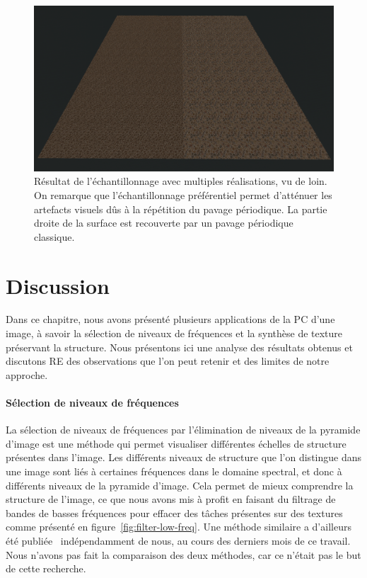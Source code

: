 \begin{figure}[t]
    \centering
    \includegraphics[width=\textwidth]{contenu/resources/images/partitioned_sampling_pc_preserving_shuffle_uv_far}
    \caption[Résultat de l'échantillonnage avec multiples réalisations, vu de loin.]{Résultat de l'échantillonnage avec multiples réalisations, vu de loin. On remarque que l'échantillonnage préférentiel permet d'atténuer les artefacts visuels dûs à la répétition du pavage périodique. La partie droite de la surface est recouverte par un pavage périodique classique.}
    \label{fig:pc-preserving-synthesis}
\end{figure}

\section{Discussion}

Dans ce chapitre, nous avons présenté plusieurs applications de la PC d'une image, à savoir la sélection de niveaux de fréquences et la synthèse de texture préservant la structure. Nous présentons ici une analyse des résultats obtenus et discutons RE des observations que l'on peut retenir et des limites de notre approche.

\paragraph{Sélection de niveaux de fréquences}

La sélection de niveaux de fréquences par l'élimination de niveaux de la pyramide d'image est une méthode qui permet visualiser différentes échelles de structure présentes dans l'image. Les différents niveaux de structure que l'on distingue dans une image sont liés à certaines fréquences dans le domaine spectral, et donc à différents niveaux de la pyramide d'image. Cela permet de mieux comprendre la structure de l'image, ce que nous avons mis à profit en faisant du filtrage de bandes de basses fréquences pour effacer des \og tâches \fg présentes sur des textures comme présenté en figure~\ref{fig:filter-low-freq}. Une méthode similaire a d'ailleurs été publiée~\cite{zhang_pyramid_2023} indépendamment de nous, au cours des derniers mois de ce travail. Nous n'avons pas fait la comparaison des deux méthodes, car ce n'était pas le but de cette recherche.


